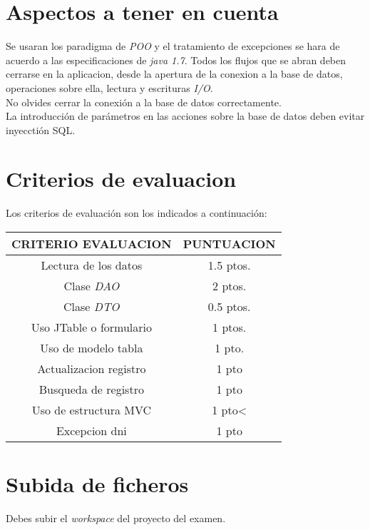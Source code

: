 \documentclass[4paper]{article}
\begin{document}
\section*{Aspectos a tener en cuenta}
Se usaran los paradigma de \emph{POO} y el tratamiento de excepciones se hara de acuerdo a las especificaciones de \emph{java 1.7}. Todos los flujos que se abran deben cerrarse en la aplicacion, desde la apertura de la conexion a la base de datos, operaciones sobre ella, lectura y escrituras \emph{I/O}.\\
No olvides cerrar la conexión a la base de datos correctamente.\\
La introducción de parámetros en las acciones sobre la base de datos deben evitar inyecctión SQL.


\section*{Criterios de evaluacion}
Los criterios de evaluación son los indicados a continuación:\par 
\vspace*{0.5cm}
\begin{tabular}{|c|c|}
\hline
\textbf{CRITERIO EVALUACION} & \textbf{PUNTUACION} \\

\hline
Lectura de los datos  & 1.5 ptos.\\
\hline
Clase \emph{DAO} & 2 ptos.\\
\hline
Clase \emph{DTO} & 0.5 ptos.\\
\hline
Uso JTable o formulario  & 1 ptos.\\
\hline
Uso de modelo tabla & 1 pto.\\
\hline
Actualizacion registro & 1 pto \\
\hline
Busqueda de registro & 1 pto\\
\hline
Uso de estructura MVC & 1 pto<\\
\hline
Excepcion dni & 1 pto\\
\hline
\end{tabular}
\par 
\section*{Subida de ficheros}
Debes subir el \emph{workspace} del proyecto del examen.
\end{document}

